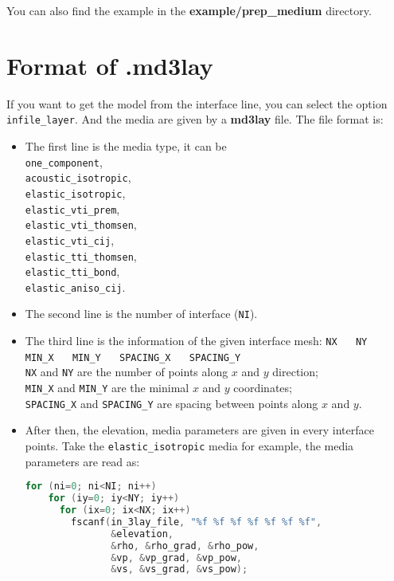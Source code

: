You can also find the example in the \textbf{example/prep\_medium} directory.

\section{Format of .md3lay} \label{md3lay}

If you want to get the model from the interface line, you can select the option \texttt{infile\_layer}.
And the media are given by a \textbf{md3lay} file. The file format is:

\begin{itemize}
  \item The first line is the media type, it can be \\
  \texttt{one\_component}, \\ 
  \texttt{acoustic\_isotropic}, \\
  \texttt{elastic\_isotropic}, \\
  \texttt{elastic\_vti\_prem}, \\
  \texttt{elastic\_vti\_thomsen}, \\ 
  \texttt{elastic\_vti\_cij}, \\
  \texttt{elastic\_tti\_thomsen}, \\ 
  \texttt{elastic\_tti\_bond}, \\
  \texttt{elastic\_aniso\_cij}.  

  \item The second line is the number of interface (\texttt{NI}).

  \item {The third line is the information of the given interface mesh:
  \texttt{NX} ~~ \texttt{NY} ~~ \texttt{MIN\_X} ~~ \texttt{MIN\_Y} ~~ \texttt{SPACING\_X} ~~ \texttt{SPACING\_Y} \\
  \texttt{NX} and \texttt{NY} are the number of points along $x$ and $y$ direction;\\
  \texttt{MIN\_X} and \texttt{MIN\_Y} are the minimal $x$ and $y$ coordinates;\\
  \texttt{SPACING\_X} and \texttt{SPACING\_Y} are spacing between points along $x$ and $y$.
 }

 \item {
  After then, the elevation, media parameters are given in every interface points. Take the \texttt{elastic\_isotropic} media for example, the media parameters are read as:
  \begin{lstlisting}[language = C]
  for (ni=0; ni<NI; ni++)
    for (iy=0; iy<NY; iy++) 
      for (ix=0; ix<NX; ix++) 
        fscanf(in_3lay_file, "%f %f %f %f %f %f %f", 
               &elevation,
               &rho, &rho_grad, &rho_pow,
               &vp, &vp_grad, &vp_pow,
               &vs, &vs_grad, &vs_pow);
  \end{lstlisting}
 }


\end{itemize}
